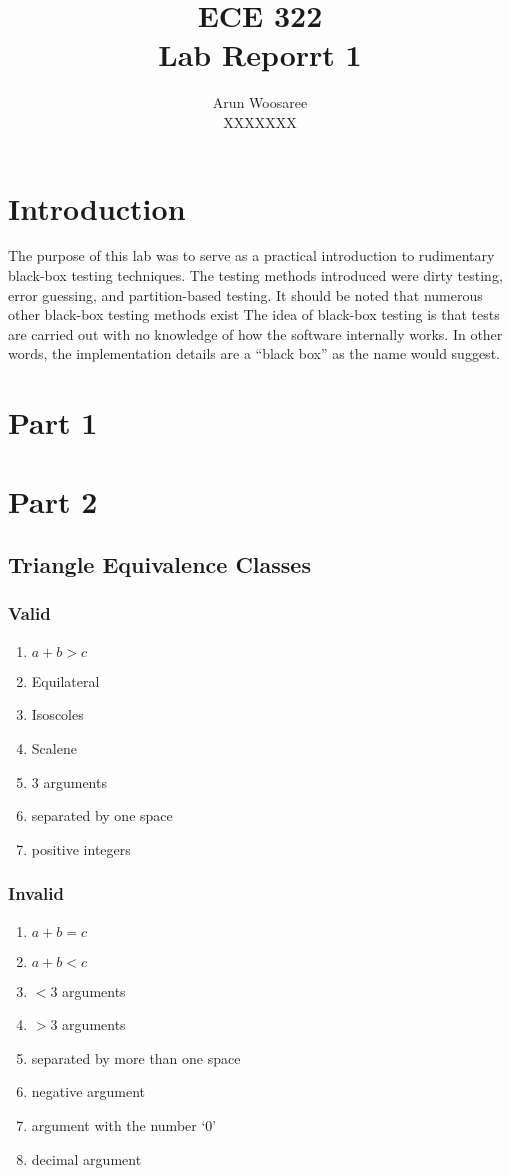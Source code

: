 \documentclass[letterpaper]{article}
\title{ECE 322 \\
Lab Reporrt 1}
\author{Arun Woosaree\\
XXXXXXX}
\begin{document}
 \maketitle 

 \section*{Introduction}
 The purpose of this lab was to serve as a practical introduction to rudimentary black-box testing techniques.
 The testing methods introduced were dirty testing, error guessing, and partition-based testing.
 It should be noted that numerous other black-box testing methods exist
 The idea of black-box testing is that tests are carried out with no knowledge of how the software
 internally works. In other words, the implementation details are a ``black box'' as the name would suggest.

\section*{Part 1}

\section*{Part 2}

\subsection*{Triangle Equivalence Classes}
\subsubsection*{Valid}
\begin{enumerate}
    \item $a + b > c$
    \item Equilateral
    \item Isoscoles
    \item Scalene
    \item 3 arguments
    \item separated by one space
    \item positive integers
\end{enumerate}

\subsubsection*{Invalid}
\begin{enumerate}
    \item $a + b = c$
    \item $ a + b < c$
    \item $< 3$ arguments
    \item $> 3$ arguments
    \item separated by more than one space
    \item negative argument
    \item argument with the number `0'
    \item decimal argument
\end{enumerate}
\end{document}
